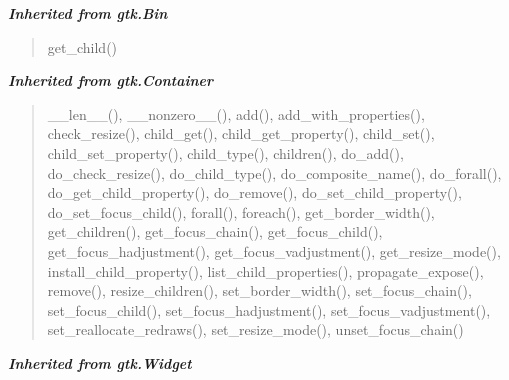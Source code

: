 \large{\textbf{\textit{Inherited from gtk.Bin}}}

\begin{quote}
get\_child()
\end{quote}

\large{\textbf{\textit{Inherited from gtk.Container}}}

\begin{quote}
\_\_len\_\_(), \_\_nonzero\_\_(), add(), add\_with\_properties(), check\_resize(), child\_get(), child\_get\_property(), child\_set(), child\_set\_property(), child\_type(), children(), do\_add(), do\_check\_resize(), do\_child\_type(), do\_composite\_name(), do\_forall(), do\_get\_child\_property(), do\_remove(), do\_set\_child\_property(), do\_set\_focus\_child(), forall(), foreach(), get\_border\_width(), get\_children(), get\_focus\_chain(), get\_focus\_child(), get\_focus\_hadjustment(), get\_focus\_vadjustment(), get\_resize\_mode(), install\_child\_property(), list\_child\_properties(), propagate\_expose(), remove(), resize\_children(), set\_border\_width(), set\_focus\_chain(), set\_focus\_child(), set\_focus\_hadjustment(), set\_focus\_vadjustment(), set\_reallocate\_redraws(), set\_resize\_mode(), unset\_focus\_chain()
\end{quote}

\large{\textbf{\textit{Inherited from gtk.Widget}}}

